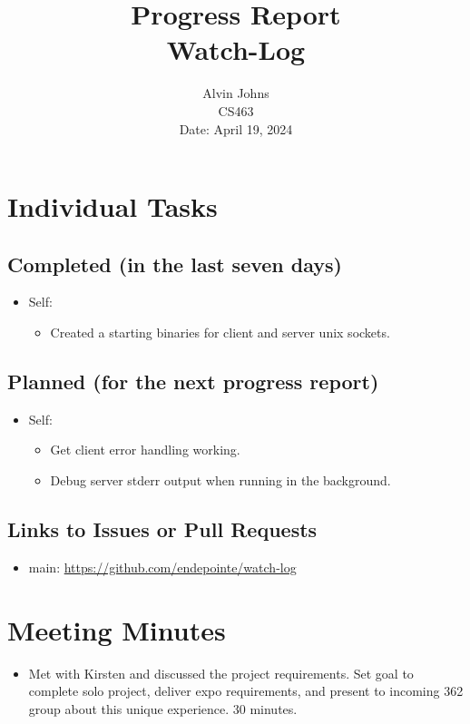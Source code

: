 \documentclass{article}
\title{Progress Report\\[0.5em]
\large Watch-Log}
\author{Alvin Johns\\
CS463\\
Date: April 19, 2024}
\date{}
\begin{document}
\maketitle

\section*{Individual Tasks}
\subsection*{Completed (in the last seven days)}
\begin{itemize}[label={--}]
    \item Self:
        \begin{itemize}[label={}]
            \item Created a starting binaries for client and server unix sockets.
        \end{itemize}
\end{itemize}

\subsection*{Planned (for the next progress report)}
\begin{itemize}[label={--}]
    \item Self:
        \begin{itemize}[label={}]
            \item Get client error handling working. 
            \item Debug server stderr output when running in the background. 
        \end{itemize}
\end{itemize}

\subsection*{Links to Issues or Pull Requests}
\begin{itemize}[label={--}]
    \item main: \url{https://github.com/endepointe/watch-log}
\end{itemize}

\section*{Meeting Minutes}
\begin{itemize}[label={--}]
    \item Met with Kirsten and discussed the project requirements. Set goal to complete solo project, deliver expo requirements, and present to incoming 362 group about this unique experience. 30 minutes.
\end{itemize}
\end{document}
